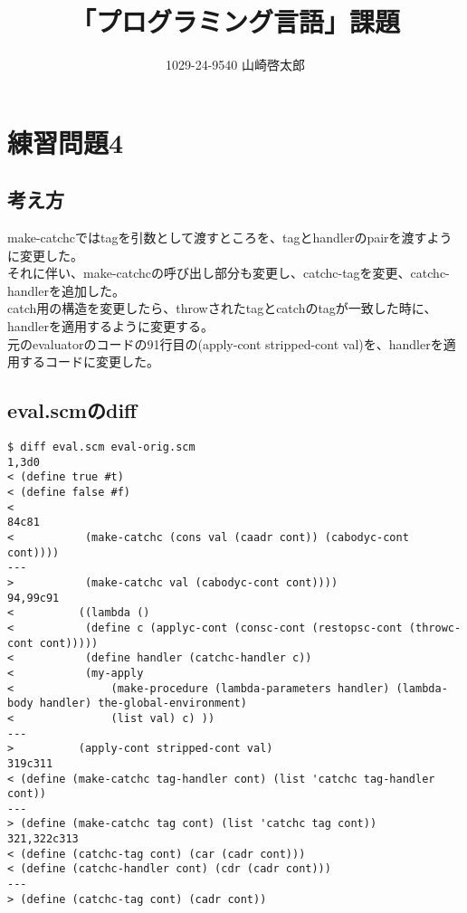 \documentclass[a4paper,12pt]{article}
\title{「プログラミング言語」課題}
\author{1029-24-9540 山崎啓太郎}
\begin{document}
\lstset{numbers=left,basicstyle=\small}
\maketitle

\section{練習問題4}
\subsection{考え方}
make-catchcではtagを引数として渡すところを、tagとhandlerのpairを渡すように変更した。\\
それに伴い、make-catchcの呼び出し部分も変更し、catchc-tagを変更、catchc-handlerを追加した。\\
catch用の構造を変更したら、throwされたtagとcatchのtagが一致した時に、handlerを適用するように変更する。\\
元のevaluatorのコードの91行目の(apply-cont stripped-cont val)を、handlerを適用するコードに変更した。\\

\subsection{eval.scmのdiff}
{\small
\begin{verbatim}
$ diff eval.scm eval-orig.scm 
1,3d0
< (define true #t)
< (define false #f)
< 
84c81
< 			(make-catchc (cons val (caadr cont)) (cabodyc-cont cont))))
---
> 			(make-catchc val (cabodyc-cont cont))))
94,99c91
< 	       ((lambda () 
< 	       	(define c (applyc-cont (consc-cont (restopsc-cont (throwc-cont cont)))))
< 	       	(define handler (catchc-handler c))
< 	       	(my-apply 
< 	       		(make-procedure (lambda-parameters handler) (lambda-body handler) the-global-environment)
< 	       		(list val) c) ))
---
> 	       (apply-cont stripped-cont val)
319c311
< (define (make-catchc tag-handler cont) (list 'catchc tag-handler cont))
---
> (define (make-catchc tag cont) (list 'catchc tag cont))
321,322c313
< (define (catchc-tag cont) (car (cadr cont)))
< (define (catchc-handler cont) (cdr (cadr cont)))
---
> (define (catchc-tag cont) (cadr cont))
\end{verbatim}
}
\end{document}
